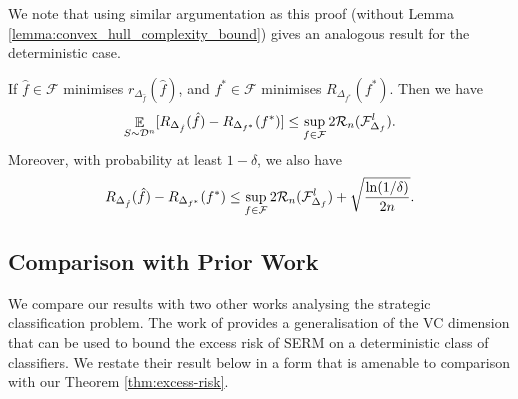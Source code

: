 We note that using similar argumentation as this proof (without Lemma \ref{lemma:convex_hull_complexity_bound}) gives an analogous result for the deterministic case.

\begin{theorem}
    If $\hat{f} \in \mathcal{F}$ minimises $r_{\Delta_{\hat{f}}}(\hat{f})$, and $f^{\ast} \in \mathcal{F}$ minimises $R_{\Delta_{f^{\ast}}}(f^{\ast})$. Then we have
    \begin{equation*}
        \mathop{\mathbb{E}}_{S \sim \mathcal{D}^{n}} [R_{\Delta_{\hat{f}}}(\hat{f}) - R_{\Delta_{f^\ast}}(f^\ast)] \leq \sup_{f \in {\mathcal{F}}} 2 {\mathcal{R}}_{n}({\mathcal{F}}^{l}_{\Delta_f}).
    \end{equation*}
    Moreover, with probability at least $1-\delta$, we also have
    \begin{equation}
        R_{\Delta_{\hat{f}}}(\hat{f}) - R_{\Delta_{f^\ast}}(f^\ast) \leq \sup_{f \in {\mathcal{F}}} 2 {\mathcal{R}}_{n}({\mathcal{F}}^{l}_{\Delta_f}) + \sqrt{\frac{\ln(1/\delta)}{2n}}.
    \end{equation}
    \label{thm:excess-risk-deterministic}
\end{theorem}

\subsection{Comparison with Prior Work}
We compare our results with two other works analysing the strategic classification problem. The work of \citet{sundaram2023} provides a generalisation of the VC dimension that can be used to bound the excess risk of SERM on a deterministic class of classifiers. We restate their result below in a form that is amenable to comparison with our Theorem \ref{thm:excess-risk}.

